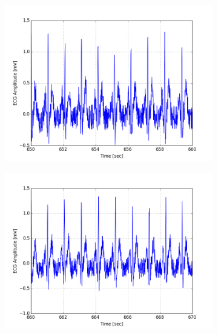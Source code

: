 \documentclass[paper=a4, fontsize=11pt]{scrartcl}
\numberwithin{equation}{section}		%
\numberwithin{figure}{section}			%
\numberwithin{table}{section}		    %
\begin{document}
\begin{appendices}
\begin{figure}[H]
	\centering
	\begin{subfigure}[b]{0.3\textwidth}
		\includegraphics[width=\textwidth]{sim/ecg_19}
	\end{subfigure}
	\begin{subfigure}[b]{0.3\textwidth}
		\includegraphics[width=\textwidth]{sim/ecg_20}
	\end{subfigure}
	\begin{subfigure}[b]{0.3\textwidth}

\end{subfigure}
\end{figure}
\end{appendices}
\end{document}
